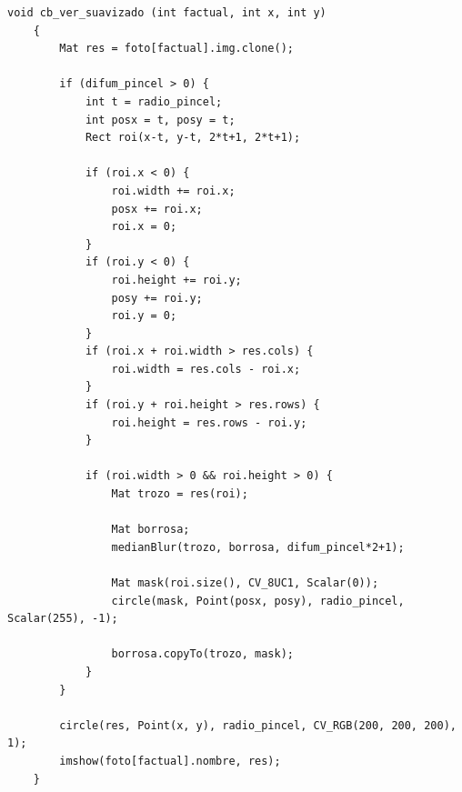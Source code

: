 \documentclass[11pt]{article}
\begin{document}
          \begin{lstlisting}[style=CppQtStyle, caption={Código de la implementación de \texttt{cb\_ver\_suavizado()}.}]
    void cb_ver_suavizado (int factual, int x, int y)
    {
        Mat res = foto[factual].img.clone();

        if (difum_pincel > 0) {
            int t = radio_pincel;
            int posx = t, posy = t;
            Rect roi(x-t, y-t, 2*t+1, 2*t+1);

            if (roi.x < 0) {
                roi.width += roi.x;
                posx += roi.x;
                roi.x = 0;
            }
            if (roi.y < 0) {
                roi.height += roi.y;
                posy += roi.y;
                roi.y = 0;
            }
            if (roi.x + roi.width > res.cols) {
                roi.width = res.cols - roi.x;
            }
            if (roi.y + roi.height > res.rows) {
                roi.height = res.rows - roi.y;
            }

            if (roi.width > 0 && roi.height > 0) {
                Mat trozo = res(roi);

                Mat borrosa;
                medianBlur(trozo, borrosa, difum_pincel*2+1);

                Mat mask(roi.size(), CV_8UC1, Scalar(0));
                circle(mask, Point(posx, posy), radio_pincel, Scalar(255), -1);

                borrosa.copyTo(trozo, mask);
            }
        }

        circle(res, Point(x, y), radio_pincel, CV_RGB(200, 200, 200), 1);
        imshow(foto[factual].nombre, res);
    }
\end{lstlisting}
\end{document}
